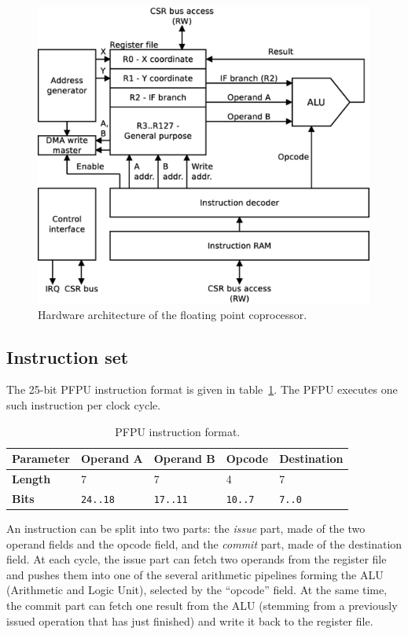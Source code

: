 \documentclass[a4paper,11pt]{kthesis}
\begin{document}
\begin{figure}[htp]
\centering
\includegraphics[height=100mm]{pfpu_architecture.eps}
\caption{Hardware architecture of the floating point coprocessor.}
\label{fig:pfpuarch}
\end{figure}

\subsection{Instruction set}
The 25-bit PFPU instruction format is given in table~\ref{tab:pfpuinst}. The PFPU executes one such instruction per clock cycle.

\begin{table}
\centering
\begin{tabular}{|l|l|l|l|l|}
\hline
\textbf{Parameter} & Operand A & Operand B & Opcode & Destination \\
\hline
\textbf{Length} & 7 & 7 & 4 & 7 \\
\hline
\textbf{Bits} & \verb!24..18! & \verb!17..11! & \verb!10..7! & \verb!7..0! \\
\hline
\end{tabular}
\caption{PFPU instruction format.}\label{tab:pfpuinst}
\end{table}

An instruction can be split into two parts: the \textit{issue} part, made of the two operand fields and the opcode field, and the \textit{commit} part, made of the destination field. At each cycle, the issue part can fetch two operands from the register file and pushes them into one of the several arithmetic pipelines forming the ALU (Arithmetic and Logic Unit), selected by the ``opcode'' field. At the same time, the commit part can fetch one result from the ALU (stemming from a previously issued operation that has just finished) and write it back to the register file.
\end{document}
